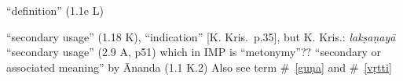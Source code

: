 \documentclass[10pt]{article}
\begin{document}
\begin{multicols}{2}
\begin{enumerate}[
			leftmargin=0em,
			rightmargin=0em,
		]
		 ``definition'' (1.1e L)

		 ``secondary usage'' (1.18 K), ``indication'' [K. Kris.\ p.35],
		but K. Kris.: \textit{lakṣaṇayā} ``secondary usage'' (2.9 A, p51) which in IMP is ``metonymy''??
		``secondary or associated meaning'' by Ānanda (1.1 K.2)
		Also see term \#~\ref{guṇa} and \#~\ref{vṛtti}




\end{enumerate}
\end{multicols}
\end{document}

